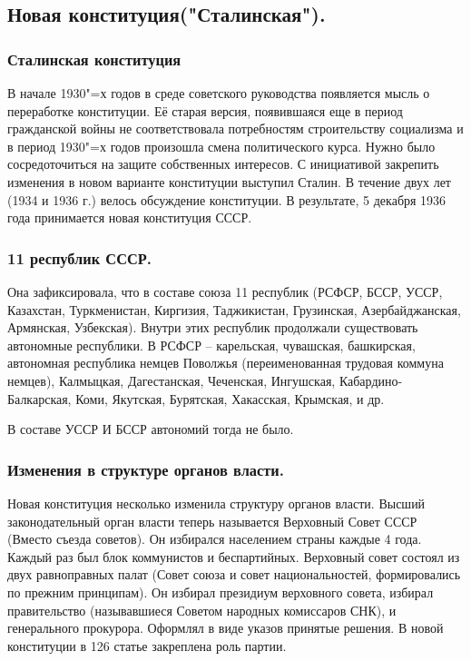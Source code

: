 \subsection{Новая конституция("Сталинская").}

\subsubsection{\textbf{Сталинская конституция}}
В начале 1930"=х годов в среде советского руководства появляется мысль о переработке конституции. Её старая версия, появившаяся еще в период гражданской войны не соответствовала потребностям строительству социализма и в период 1930"=х годов произошла смена политического курса. Нужно было сосредоточиться на защите собственных интересов. С инициативой закрепить изменения в новом варианте конституции выступил Сталин. В течение двух лет (1934 и 1936 г.) велось обсуждение конституции. В результате, 5 декабря 1936 года принимается новая конституция СССР. 

\subsubsection{\textbf{11 республик СССР.}}
Она зафиксировала, что в составе союза 11 республик (РСФСР, БССР, УССР, Казахстан, Туркменистан, Киргизия, Таджикистан, Грузинская, Азербайджанская, Армянская, Узбекская). Внутри этих республик продолжали существовать автономные республики. В РСФСР – карельская, чувашская, башкирская, автономная республика немцев Поволжья (переименованная трудовая коммуна немцев), Калмыцкая, Дагестанская, Чеченская, Ингушская, Кабардино-Балкарская, Коми, Якутская, Бурятская, Хакасская, Крымская, и др.

В составе УССР И БССР автономий тогда не было.

\subsubsection{\textbf{Изменения в структуре органов власти.}}

Новая конституция несколько изменила структуру органов власти. Высший законодательный орган власти теперь называется Верховный Совет СССР (Вместо съезда советов). Он избирался населением страны каждые 4 года. Каждый раз был блок коммунистов и беспартийных. Верховный совет состоял из двух равноправных палат (Совет союза и совет национальностей, формировались по прежним принципам). Он избирал президиум верховного совета, избирал правительство (называвшиеся Советом народных комиссаров СНК), и генерального прокурора. Оформлял в виде указов принятые решения.
В новой конституции в 126 статье закреплена роль партии. 

